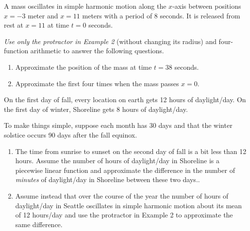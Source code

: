 \documentclass{ximera}
\begin{document}
\begin{example} \label{Ex:8dferGGDEE}
A mass oscillates in simple harmonic motion along the $x$-axis between positions $x=-3$ meter and $x=11$ meters with a period of $8$ seconds. It is released from rest at $x=11$ at time $t=0$ seconds.

\emph{Use only the protractor in Example 2} (without changing its radius) and four-function arithmetic to answer the following questions.

\begin{enumerate}
\item Approximate the position of the mass at time $t=38$ seconds.

\item Approximate the first four times when the mass passes $x=0$.
\end{enumerate}

\end{example}


\begin{example} \label{Ex:Lfe3r340900}
On the first day of fall, every location on earth gets 12 hours of daylight/day. On the first day of winter, Shoreline gets $8$ hours of daylight/day.

To make things simple, suppose each month has 30 days and that the winter solstice occurs 90 days after the fall equinox.

\begin{enumerate}
\item The time from sunrise to sunset on the second day of fall is a bit less than 12 hours. Assume the number of hours of daylight/day in Shoreline is a piecewise linear function and approximate the difference in the number of \emph{minutes} of daylight/day in Shoreline between these two days..

\item Assume instead that over the course of the year the number of hours of daylight/day in Seattle oscillates in simple harmonic motion about its mean of 12 hours/day and use the protractor in Example 2 to approximate the same difference.
\end{enumerate}

\end{example}
\end{document}
